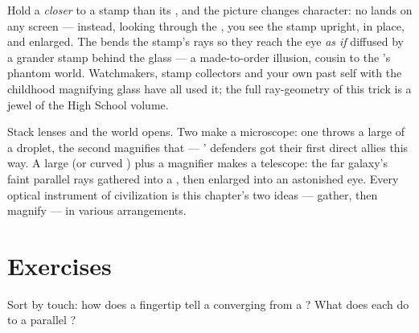 \begin{example}\label{ex:g8:lenses-images:magnifier}
Hold a  \emph{closer} to a stamp than its , and the picture changes character: no  lands on
any screen --- instead, looking through the , you see the
stamp upright, in place, and enlarged. The  bends the
stamp's rays so they reach the eye \emph{as if} diffused by a
grander stamp behind the glass --- a made-to-order illusion,
cousin to the 's phantom world. Watchmakers, stamp
collectors and your own past self with the childhood
magnifying glass have all used it; the full ray-geometry of
this trick is a jewel of the High School volume.
\end{example}

\begin{remark}\label{rem:g8:lenses-images:instruments}
Stack lenses and the world opens. Two  make
a microscope: one throws a large  of a droplet,
the second magnifies that  --- ' defenders got
their first direct allies this way. A large  (or curved
) plus a magnifier makes a telescope: the far galaxy's
faint parallel rays gathered into a , then enlarged
into an astonished eye. Every optical instrument of
civilization is this chapter's two ideas --- gather, then
magnify --- in various arrangements.
\end{remark}

\section{Exercises}

\begin{exercise}[$\star$]\label{exo:g8:lenses-images:1}
Sort by touch: how does a fingertip tell a converging from a
? What does each do to a parallel ?
\end{exercise}

